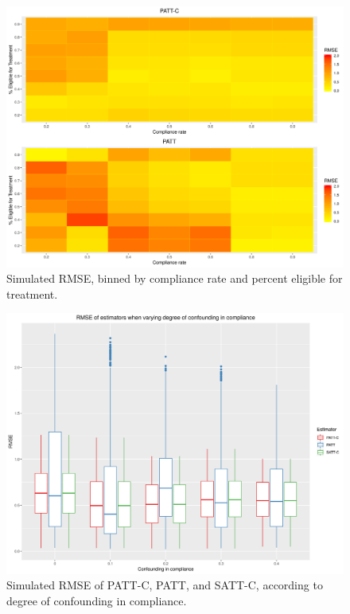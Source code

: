 \documentclass[hidelinks,12pt]{article}
\begin{document}
{\begin{appendices}
\begin{figure}[htbp]
	\begin{center}
		\includegraphics[width = 1\textwidth]{rmse_ratec_ratet}
		\caption{Simulated RMSE, binned by compliance rate and percent eligible for treatment. \label{fig:rmse_ratec_ratet}}
	\end{center}
\end{figure}

\begin{figure}[htbp]
	\begin{center}
		\includegraphics[width = 1\textwidth]{rmse_boxplots_RateConC}
		\caption{Simulated RMSE of PATT-C, PATT, and SATT-C, according to degree of confounding in compliance.\label{fig:rmse_boxplots_RateConC}}
	\end{center}
\end{figure}


\end{appendices}}
\end{document}
